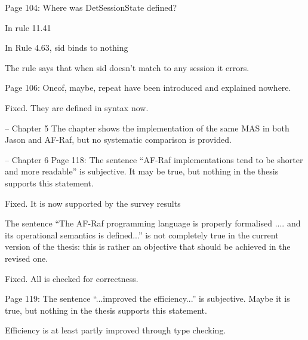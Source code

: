 \documentclass{article}
\newcommand{\todo}[1]{[\textcolor{red}{TODO}: #1]}
\newenvironment{them}{\noindent\begingroup\color{blue}}{\endgroup\par}
\begin{document}
\begin{them}

Page 104:
Where was DetSessionState defined?
\end{them}
In rule 11.41

\begin{them}

In Rule 4.63, sid binds to nothing
\end{them}
The rule says that when sid doesn't match to any session it errors.

\begin{them}

Page 106:
Oneof, maybe, repeat have been introduced and explained nowhere.
\end{them}
Fixed. They are defined in syntax now.

\begin{them}

-- Chapter 5
The chapter shows the implementation of the same MAS in both Jason and AF-Raf,
but no systematic comparison is provided.

\end{them}
\todo{}

\begin{them}

-- Chapter 6
Page 118:
The sentence “AF-Raf implementations tend to be shorter and more readable” is
subjective. It may be true, but nothing in the thesis supports this statement.

\end{them}
Fixed. It is now supported by the survey results

\begin{them}

The sentence “The AF-Raf programming language is properly formalised .... and
its operational semantics is defined...” is not completely true in the current
version of the thesis: this is rather an objective that should be achieved in
the revised one.

\end{them}
Fixed. All is checked for correctness.

\begin{them}

Page 119:
The sentence “...improved the efficiency...” is subjective. Maybe it is true,
but nothing in the thesis supports this statement.

\end{them}
Efficiency is at least partly improved through type checking.
\end{document}
